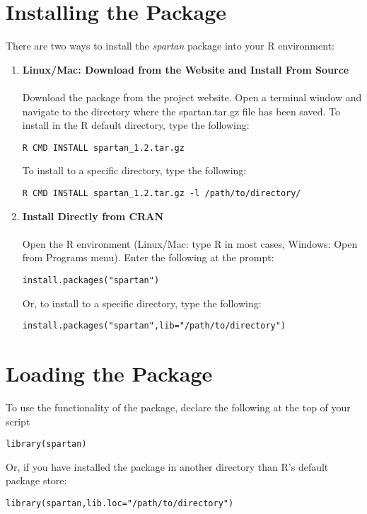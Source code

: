 \documentclass[a4paper,11pt]{article}
\begin{document}
\section{Installing the Package}
\noindent There are two ways to install the \textit{spartan} package into your R environment:
\begin{enumerate}
\item \textbf{Linux/Mac: Download from the Website and Install From Source}\\
\\
Download the package from the project website. Open a terminal window and navigate to the directory where the spartan.tar.gz file has been saved. To install in the R default directory, type the following:
\begin{verbatim}
R CMD INSTALL spartan_1.2.tar.gz
\end{verbatim}
To install to a specific directory, type the following:
\begin{verbatim}
R CMD INSTALL spartan_1.2.tar.gz -l /path/to/directory/
\end{verbatim}

\item \textbf{Install Directly from CRAN}
\\
\\
Open the R environment (Linux/Mac: type R in most cases, Windows: Open from Programs menu). Enter the following at the prompt:
\begin{verbatim}
install.packages("spartan")
\end{verbatim}
Or, to install to a specific directory, type the following:
\begin{verbatim}
install.packages("spartan",lib="/path/to/directory")
\end{verbatim}

\end{enumerate}

\section{Loading the Package}
\noindent To use the functionality of the package, declare the following at the top of your script
\begin{verbatim}
library(spartan)
\end{verbatim}
Or, if you have installed the package in another directory than R's default package store:
\begin{verbatim}
library(spartan,lib.loc="/path/to/directory")
\end{verbatim}
\end{document}
